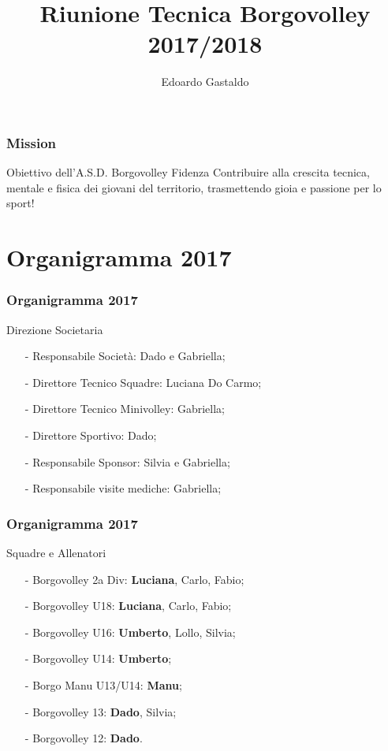 \documentclass{beamer}
\title[Borgovolley 2017/2018]{Riunione Tecnica Borgovolley 2017/2018}
\author{Edoardo Gastaldo}
\date[24 Agosto 2017]{}
\begin{document}
\begin{frame}
\maketitle
\tableofcontents
\end{frame}

\begin{frame}
\frametitle{Mission}
\begin{block}{Obiettivo dell'A.S.D. Borgovolley Fidenza}
Contribuire alla \alert{crescita} tecnica, mentale e fisica dei giovani del \alert{territorio}, trasmettendo \alert{gioia} e passione per lo sport!
\end{block}
\end{frame}

\section{Organigramma 2017}
\begin{frame}
\frametitle{Organigramma 2017}
\begin{block}{Direzione Societaria}
\begin{itemize}
\item[-]Responsabile Società: Dado e Gabriella;
\item[-]Direttore Tecnico Squadre: Luciana Do Carmo;
\item[-]Direttore Tecnico Minivolley: Gabriella;
\item[-]Direttore Sportivo: Dado;
\item[-]Responsabile Sponsor: Silvia e Gabriella;
\item[-]Responsabile visite mediche: Gabriella;
\end{itemize}
\end{block}
\end{frame}

\begin{frame}
\frametitle{Organigramma 2017}
\begin{block}{Squadre e Allenatori}
\begin{itemize}
\item[-]Borgovolley 2a Div: \textbf{Luciana}, Carlo, Fabio;
\item[-]Borgovolley U18: \textbf{Luciana}, Carlo, Fabio;
\item[-]Borgovolley U16: \textbf{Umberto}, Lollo, Silvia;
\item[-]Borgovolley U14: \textbf{Umberto};
\item[-]Borgo Manu U13/U14: \textbf{Manu};
\item[-]Borgovolley 13: \textbf{Dado}, Silvia;
\item[-]Borgovolley 12: \textbf{Dado}.
\end{itemize}
\end{block}

\end{frame}
\end{document}
